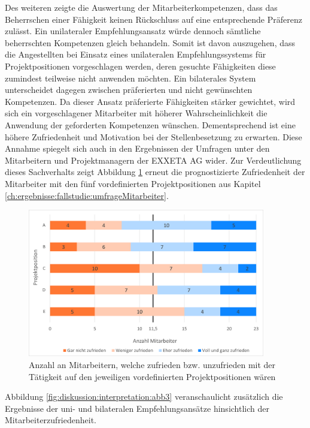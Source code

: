 Des weiteren zeigte die Auswertung der Mitarbeiterkompetenzen, dass das Beherrschen einer Fähigkeit keinen Rückschluss auf eine entsprechende Präferenz zulässt. Ein unilateraler Empfehlungsansatz würde dennoch sämtliche beherrschten Kompetenzen gleich behandeln. Somit ist davon auszugehen, dass die Angestellten bei Einsatz eines unilateralen Empfehlungssystems für Projektpositionen vorgeschlagen werden, deren gesuchte Fähigkeiten diese zumindest teilweise nicht anwenden möchten. Ein bilaterales System unterscheidet dagegen zwischen präferierten und nicht gewünschten Kompetenzen. Da dieser Ansatz präferierte Fähigkeiten stärker gewichtet, wird sich ein vorgeschlagener Mitarbeiter mit höherer Wahrscheinlichkeit die Anwendung der geforderten Kompetenzen wünschen. Dementsprechend ist eine höhere Zufriedenheit und Motivation bei der Stellenbesetzung zu erwarten. Diese Annahme spiegelt sich auch in den Ergebnissen der Umfragen unter den Mitarbeitern und Projektmanagern der EXXETA AG wider. Zur Verdeutlichung dieses Sachverhalts zeigt Abbildung \ref{fig:diskussion:interpretation:abb1} erneut die prognostizierte Zufriedenheit der Mitarbeiter mit den fünf vordefinierten Projektpositionen aus Kapitel \ref{ch:ergebnisse:fallstudie:umfrageMitarbeiter}.

\begin{figure}[h]
	\centering
	\includegraphics[width=0.925\textwidth]{gfx/mitarbeiter-zufriedenheit-umfrage.png}
	\caption{Anzahl an Mitarbeitern, welche zufrieden bzw. unzufrieden mit der Tätigkeit auf den jeweiligen vordefinierten Projektpositionen wären}
	\label{fig:diskussion:interpretation:abb1}
\end{figure}

Abbildung \ref{fig:diskussion:interpretation:abb3} veranschaulicht zusätzlich die Ergebnisse der uni- und bilateralen Empfehlungsansätze hinsichtlich der Mitarbeiterzufriedenheit. 

